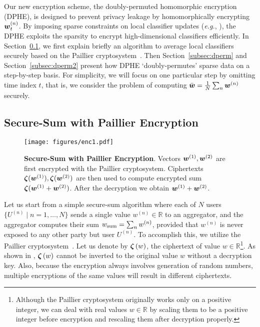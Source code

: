 \documentclass[10pt,twocolumn,letterpaper]{article}
\def\sub#1{_{\rm #1}}
\def\vct#1{\mbox{\boldmath $#1$}}
\def\eg{{\it e.g.}}
\def\ui#1{^{(#1)}}
\def\he#1{\vct{\zeta}\left(#1\right)}
\def\hes#1{\vct{\zeta}(#1)}
\begin{document}
Our new encryption scheme, the doubly-permuted homomorphic encryption (DPHE), is designed to prevent privacy leakage by homomorphically encrypting $\vct{w}\ui{n}_t$. By imposing sparse constraints on local classifier updates (\eg, \cite{Friedman2012,Tibshirani1994,Zou2005a}), the DPHE exploits the sparsity to encrypt high-dimensional classifiers efficiently. In Section~\ref{subsec:he}, we first explain briefly an algorithm to average local classifiers securely based on the Paillier cryptosystem~\cite{Paillier1999a}. Then Section~\ref{subsec:dperm} and Section~\ref{subsec:dperm2} present how DPHE `doubly-permutes' sparse data on a step-by-step basis. For simplicity, we will focus on one particular step by omitting time index $t$, that is, we consider the problem of computing $\bar{\vct{w}}=\frac{1}{N}\sum_n \vct{w}\ui{n}$ securely. 

\subsection{Secure-Sum with Paillier Encryption}
\label{subsec:he}

\begin{figure}[t]
\centering
\texttt{[image: figures/enc1.pdf]}
\caption{{\bf Secure-Sum with Paillier Encryption}. Vectors $\vct{w}\ui{1}, \vct{w}\ui{2}$ are first encrypted with the Paillier cryptosystem. Ciphertexts $\hes{\vct{w}\ui{1}}, \hes{\vct{w}\ui{2}}$ are then used to compute encrypted sum $\hes{\vct{w}\ui{1} + \vct{w}\ui{2}}$. After the decryption we obtain $\vct{w}\ui{1} + \vct{w}\ui{2}$.}
\label{fig:enc1}
\end{figure}

Let us start from a simple secure-sum algorithm where each of $N$ users $\{U\ui{n}\mid n=1,\dots,N\}$ sends a single value $w\ui{n}\in\mathbb{R}$ to an aggregator, and the aggregator computes their sum $w\sub{sum}=\sum_n w\ui{n}$, provided that $w\ui{n}$ is never exposed to any other party but user $U\ui{n}$. To accomplish this, we utilize the Paillier cryptosystem~\cite{Paillier1999a}. Let us denote by $\he{w}$, the ciphertext of value $w\in\mathbb{R}$\footnote{Although the Paillier cryptosystem originally works only on a positive integer, we can deal with real values $w\in\mathbb{R}$ by scaling them to be a positive integer before encryption and rescaling them after decryption properly.}. As shown in \cite{Paillier1999a}, $\he{w}$ cannot be inverted to the original value $w$ without a decryption key. Also, because the encryption always involves generation of random numbers, multiple encryptions of the same values will result in different ciphertexts.
\end{document}
